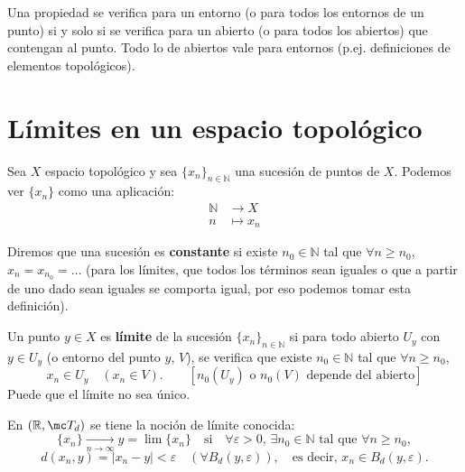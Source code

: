 \begin{obs}
    Una propiedad se verifica para un entorno (o para todos los entornos de un punto) si y solo si se verifica para un abierto (o para todos los abiertos) que contengan al punto.  
    Todo lo de abiertos vale para entornos (p.ej. definiciones de elementos topológicos).
\end{obs}

\section{Límites en un espacio topológico}
Sea \(X\) espacio topológico y sea \(\{x_n\}_{n \in \mathbb{N}}\) una sucesión de puntos de \(X\). Podemos ver \(\{x_n\}\) como una aplicación:
\[
    \begin{aligned}
        \mathbb{N} &\longrightarrow X \\
        n &\longmapsto x_n
    \end{aligned}
\]

Diremos que una sucesión es \textbf{constante} si existe \(n_0 \in \mathbb{N}\) tal que \(\forall n \ge n_0\), \(x_n = x_{n_0} = \ldots\) (para los límites, que todos los términos sean iguales o que a partir de uno dado sean iguales se comporta igual, por eso podemos tomar esta definición).

\begin{defi}
    Un punto \(y \in X\) es \textbf{límite} de la sucesión \(\{x_n\}_{n \in \mathbb{N}}\) si para todo abierto \(U_y\) con \(y \in U_y\) (o entorno del punto \(y\), \(V\)), se verifica que existe \(n_0 \in \mathbb{N}\) tal que \(\forall n \ge n_0\),
    \[
        x_n \in U_y \quad (x_n \in V). \qquad [n_0(U_y) \text{ o } n_0(V) \text{ depende del abierto}]
    \]
    Puede que el límite no sea único.
\end{defi}

\begin{ejem} En \((\mathbb{R}, \mc T_d)\) se tiene la noción de límite conocida:
    \[
        \{x_n\} \xrightarrow[n \to \infty]{} y = \lim \{x_n\}  \quad \text{si} \quad \forall \varepsilon > 0, \, \exists n_0 \in \mathbb{N} \text{ tal que } \forall n \ge n_0,
    \]
    \[
        d(x_n, y) = |x_n - y| < \varepsilon \quad (\forall B_d(y,\varepsilon)), \quad \text{es decir, } x_n \in B_d(y,\varepsilon).
    \]
\end{ejem}

